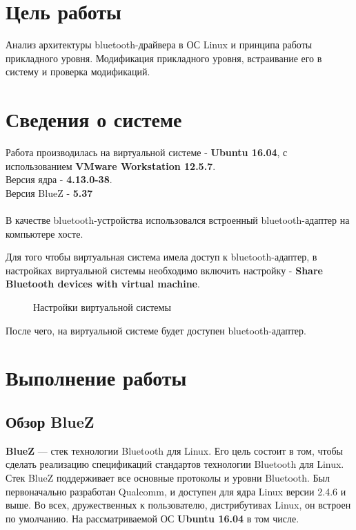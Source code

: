 


\tableofcontents
\clearpage

\section{Цель работы}
Анализ архитектуры bluetooth-драйвера в ОС Linux и принципа работы прикладного уровня. Модификация прикладного уровня, встраивание его в систему и проверка модификаций.

\section{Сведения о системе}
Работа производилась на виртуальной системе - \textbf{Ubuntu 16.04}, с использованием \textbf{VMware Workstation 12.5.7}.\\Версия ядра - \textbf{4.13.0-38}.\\Версия BlueZ - \textbf{5.37}\\\\
В качестве bluetooth-устройства использовался встроенный bluetooth-адаптер на компьютере хосте.

Для того чтобы виртуальная система имела доступ к bluetooth-адаптер, в настройках виртуальной системы необходимо включить настройку - \textbf{Share Bluetooth devices with virtual machine}.

\begin{figure}[H]
  \centering
  \caption{Настройки виртуальной системы}
\end{figure}
После чего, на виртуальной системе будет доступен bluetooth-адаптер.

\section{Выполнение работы}
\subsection{Обзор BlueZ}
\textbf{BlueZ} — стек технологии Bluetooth для Linux. Его цель состоит в том, чтобы сделать реализацию спецификаций стандартов технологии Bluetooth для Linux. Стек BlueZ поддерживает все основные протоколы и уровни Bluetooth. Был первоначально разработан Qualcomm, и доступен для ядра Linux версии 2.4.6 и выше. Во всех, дружественных к пользователю, дистрибутивах Linux, он встроен по умолчанию. На рассматриваемой ОС \textbf{Ubuntu 16.04} в том числе. 

